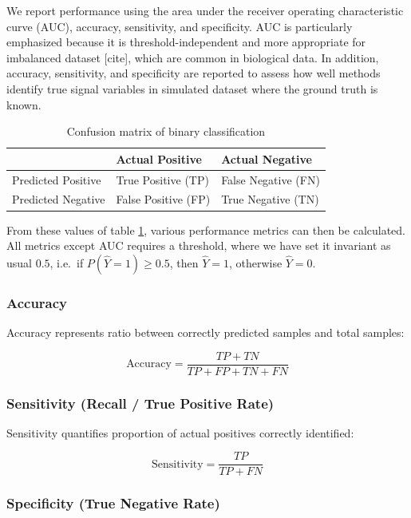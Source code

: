\documentclass[
]{article}
\begin{document}
We report performance using the area under the receiver operating characteristic curve (AUC), accuracy, sensitivity, and specificity. AUC is particularly emphasized because it is threshold-independent and more appropriate for imbalanced dataset {[}cite{]}, which are common in biological data. In addition, accuracy, sensitivity, and specificity are reported to assess how well methods identify true signal variables in simulated dataset where the ground truth is known.

\begin{table}[!h]
\centering
\caption{\label{tab:confusion-mat-tab}Confusion matrix of binary classification}
\centering
\begin{tabular}[t]{lll}
\toprule
  & Actual Positive & Actual Negative\\
\midrule
Predicted Positive & True Positive (TP) & False Negative (FN)\\
Predicted Negative & False Positive (FP) & True Negative (TN)\\
\bottomrule
\end{tabular}
\end{table}

From these values of table \ref{tab:confusion-mat-tab}, various performance metrics can then be calculated. All metrics except AUC requires a threshold, where we have set it invariant as usual \(0.5\), i.e.~if \(P (\hat{Y}=1) \geq 0.5\), then \(\hat{Y} = 1\), otherwise \(\hat{Y} = 0\).

\hypertarget{accuracy}{%
\subsubsection{Accuracy}\label{accuracy}}

Accuracy represents ratio between correctly predicted samples and total samples:

\[\text{Accuracy} = \frac{TP + TN}{TP+FP+TN+FN}\]

\hypertarget{sensitivity-recall-true-positive-rate}{%
\subsubsection{Sensitivity (Recall / True Positive Rate)}\label{sensitivity-recall-true-positive-rate}}

Sensitivity quantifies proportion of actual positives correctly identified:

\[\text{Sensitivity} = \frac{TP}{TP + FN}\]

\hypertarget{specificity-true-negative-rate}{%
\subsubsection{Specificity (True Negative Rate)}\label{specificity-true-negative-rate}}
\end{document}
